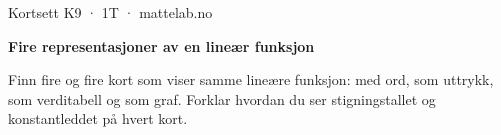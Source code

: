 \documentclass[11pt,a4paper]{article}
\begin{document}
\begin{minipage}[t]{0.8\linewidth}\vspace{0pt}
{\sffamily\small\color{dempet}Kortsett K9 · 1T · mattelab.no}\par\vspace{0.25em}
{\fontsize{20}{24}\selectfont\bfseries Fire representasjoner av en lineær funksjon}\par\vspace{0.5em}
Finn fire og fire kort som viser samme lineære funksjon: med ord, som uttrykk, som verditabell og som graf. Forklar hvordan du ser stigningstallet og konstantleddet på hvert kort.\par{}
\end{minipage}\hfill
\begin{minipage}[t]{0.15\linewidth}\vspace{0pt}\raggedleft
{}
\end{minipage}\par\vspace{0.8em}
\end{document}
